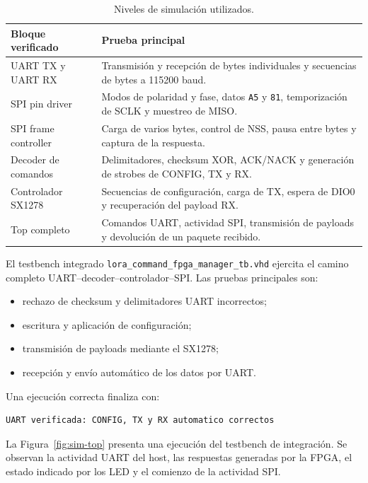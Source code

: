 \documentclass[11pt,a4paper]{article}
\newcommand{\module}[1]{\texttt{#1}}
\begin{document}
\begin{table}[H]
    \centering
    \caption{Niveles de simulación utilizados.}
    \begin{tabularx}{\textwidth}{>{\raggedright\arraybackslash}p{}X}
        \toprule
        \textbf{Bloque verificado} & \textbf{Prueba principal} \\
        \midrule
        UART TX y UART RX & Transmisión y recepción de bytes individuales y secuencias de bytes a 115200 baud. \\
        SPI pin driver & Modos de polaridad y fase, datos \module{A5} y \module{81}, temporización de SCLK y muestreo de MISO. \\
        SPI frame controller & Carga de varios bytes, control de NSS, pausa entre bytes y captura de la respuesta. \\
        Decoder de comandos & Delimitadores, checksum XOR, ACK/NACK y generación de strobes de CONFIG, TX y RX. \\
        Controlador SX1278 & Secuencias de configuración, carga de TX, espera de DIO0 y recuperación del payload RX. \\
        Top completo & Comandos UART, actividad SPI, transmisión de payloads y devolución de un paquete recibido. \\
        \bottomrule
    \end{tabularx}
\end{table}

El testbench integrado \module{lora\_command\_fpga\_manager\_tb.vhd}
ejercita el camino completo UART--decoder--controlador--SPI. Las pruebas
principales son:

\begin{itemize}
    \item rechazo de checksum y delimitadores UART incorrectos;
    \item escritura y aplicación de configuración;
    \item transmisión de payloads mediante el SX1278;
    \item recepción y envío automático de los datos por UART.
\end{itemize}

Una ejecución correcta finaliza con:

\begin{lstlisting}
UART verificada: CONFIG, TX y RX automatico correctos
\end{lstlisting}

La Figura~\ref{fig:sim-top} presenta una ejecución del testbench de integración.
Se observan la actividad UART del host, las respuestas generadas por la FPGA,
el estado indicado por los LED y el comienzo de la actividad SPI.
\end{document}
